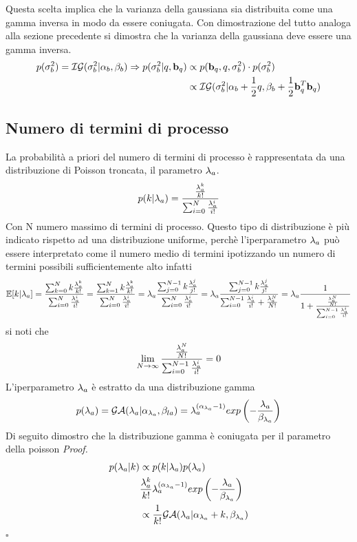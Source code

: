 Questa scelta implica che la varianza della gaussiana sia distribuita come una gamma
inversa in modo da essere coniugata. Con dimostrazione del tutto analoga alla
sezione precedente si dimostra che la varianza della gaussiana deve essere una gamma
inversa.
\begin{align*}
p(\sigma_b^2)=\mathcal{I}\mathcal{G}(\sigma_b^2|\alpha_b,\beta_b)\Rightarrow
p(\sigma_b^2|q,\textbf{b}_q) & \propto p(\textbf{b}_q,q,\sigma_b^2)\cdot p(\sigma_b^2)\\
	 &\propto \mathcal{I}\mathcal{G}(\sigma_b^2|\alpha_b+\frac{1}{2}q,\beta_b+\frac{1}{2}\textbf{b}_q^T\textbf{b}_q)	
\end{align*}

\subsection*{Numero di termini di processo}
La probabilità a priori del numero di termini di processo è rappresentata da una
distribuzione di Poisson troncata, il parametro $\lambda_a$.
\begin{equation}
p(k|\lambda_a)=\frac{\frac{\lambda_a^k}{k!}}{\sum_{i=0}^N\frac{\lambda_a^i}{i!}}
\end{equation}
Con N numero massimo di termini di processo.
Questo tipo di distribuzione è più indicato rispetto ad una distribuzione uniforme,
perchè l’iperparametro $\lambda_a$ può essere interpretato come il numero medio di termini
ipotizzando un numero di termini possibili sufficientemente alto infatti
\begin{equation}
\mathbb{E}[k|\lambda_a]=\frac{\sum_{k=0}^Nk\frac{\lambda_a^k}{k!}}{\sum_{i=0}^N\frac{\lambda_a^i}{i!}}=\frac{\sum_{k=1}^Nk\frac{\lambda_a^k}{k!}}{\sum_{i=0}^N\frac{\lambda_a^i}{i!}}=\lambda_a\frac{\sum_{j=0}^{N-1}k\frac{\lambda_a^j}{j!}}{\sum_{i=0}^N\frac{\lambda_a^i}{i!}}=
\lambda_a\frac{\sum_{j=0}^{N-1}k\frac{\lambda_a^j}{j!}}{\sum_{i=0}^{N-1}\frac{\lambda_a^i}{i!}+\frac{\lambda_a^N}{N!}}=\lambda_a\frac{1}{1+\frac{\frac{\lambda_a^N}{N!}}{\sum_{i=0}^{N-1}\frac{\lambda_a^i}{i!}}}
\end{equation}
si noti che
\begin{equation}
\lim_{N\rightarrow\infty}\frac{\frac{\lambda_a^N}{N!}}{\sum_{i=0}^{N-1}\frac{\lambda_a^i}{i!}}=0
\end{equation}
L’iperparametro $\lambda_a$ è estratto da una distribuzione gamma
\begin{equation}
p(\lambda_a)=\mathcal{G}\mathcal{A}(\lambda_a|\alpha_{\lambda_a},\beta_{la})=\lambda_a^{(\alpha_{\lambda_a}-1)}exp\left(-\frac{\lambda_a}{\beta_{\lambda_a}}\right)
\end{equation}
Di seguito dimostro che la distribuzione gamma è coniugata per il parametro della
poisson
\textit{Proof.}
\begin{align*}
p(\lambda_a|k)&\propto p(k|\lambda_a)p(\lambda_a)\\
&\frac{\lambda_a^k}{k!}\lambda_a^{(\alpha_{\lambda_a}-1)}exp\left(-\frac{\lambda_a}{\beta_{\lambda_a}}\right)\\
&\propto\frac{1}{k!}\mathcal{G}\mathcal{A}(\lambda_a|\alpha_{\lambda_a}+k,\beta_{\lambda_a})
\end{align*}
 \begin{flushright}
 $\square$
 \end{flushright}
